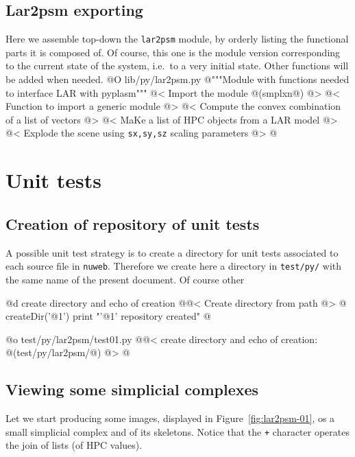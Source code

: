 \documentclass[11pt,oneside]{article}	%
\begin{document}
\subsection{Lar2psm exporting}
\label{sec:lar2psm}
Here we assemble top-down the \texttt{lar2psm} module, by orderly listing the functional parts it is composed of. Of course, this one is the module version corresponding to the current state of the system, i.e.~to a very initial state. Other functions will be added when needed.
@O lib/py/lar2psm.py
@{"""Module with functions needed to interface LAR with pyplasm"""
@< Import the module @(smplxn@) @>
@< Function to import a generic module @>
@< Compute the convex combination of a list of vectors @>
@< MaKe a list of HPC objects from a LAR model @>
@< Explode the scene using \texttt{sx,sy,sz} scaling parameters @>
@}


\section{Unit tests}

\subsection{Creation of repository of unit tests}

A possible unit test strategy is to create a directory for unit tests associated to each source file in \texttt{nuweb}. Therefore we create here a directory in \texttt{test/py/} with the same name of the present document. Of course other 

@d create directory and echo of creation
@{@< Create directory from path @>
@%
createDir('@1')
print "'@1' repository created"
@}

@o test/py/lar2psm/test01.py
@{@< create directory  and echo of creation: @(test/py/lar2psm/@) @>
@}


\subsection{Viewing some simplicial complexes}
Let we start producing some images, displayed in Figure~\ref{fig:lar2psm-01}, os a small simplicial complex and of its skeletons. Notice that the \texttt{+} character operates the join of lists (of HPC values).
\end{document}
